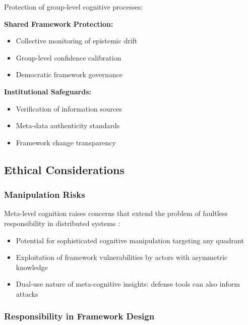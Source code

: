 \documentclass[
]{article}
\providecommand{\tightlist}{%
  \setlength{\itemsep}{0pt}\setlength{\parskip}{0pt}}
\begin{document}
Protection of group-level cognitive processes:

\textbf{Shared Framework Protection:}

\begin{itemize}
\tightlist
\item
  Collective monitoring of epistemic drift
\item
  Group-level confidence calibration
\item
  Democratic framework governance
\end{itemize}

\textbf{Institutional Safeguards:}

\begin{itemize}
\tightlist
\item
  Verification of information sources
\item
  Meta-data authenticity standards
\item
  Framework change transparency
\end{itemize}

\subsection{Ethical Considerations}\label{sec:security_ethics}

\subsubsection{Manipulation Risks}\label{manipulation-risks}

Meta-level cognition raises concerns that extend the problem of
faultless responsibility in distributed systems
\citep{floridi2016faultless}:

\begin{itemize}
\tightlist
\item
  Potential for sophisticated cognitive manipulation targeting any
  quadrant
\item
  Exploitation of framework vulnerabilities by actors with asymmetric
  knowledge
\item
  Dual-use nature of meta-cognitive insights: defense tools can also
  inform attacks
\end{itemize}

\subsubsection{Responsibility in Framework
Design}\label{responsibility-in-framework-design}
\end{document}
